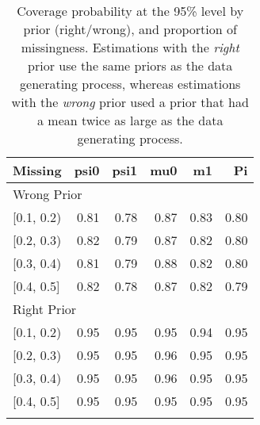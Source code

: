 \begin{table}[ht]
\centering
\begin{tabular}{lrrrrr}
  \toprule
Missing & psi0 & psi1 & mu0 & m1 & Pi \\ 
  \midrule
\multicolumn{6}{l}{Wrong Prior}\\
{[0.1, 0.2)} & 0.81 & 0.78 & 0.87 & 0.83 & 0.80 \\ 
  {[0.2, 0.3)} & 0.82 & 0.79 & 0.87 & 0.82 & 0.80 \\ 
  {[0.3, 0.4)} & 0.81 & 0.79 & 0.88 & 0.82 & 0.80 \\ 
  {[0.4, 0.5]} & 0.82 & 0.78 & 0.87 & 0.82 & 0.79 \\ 
   \midrule
\multicolumn{6}{l}{Right Prior}\\
{[0.1, 0.2)} & 0.95 & 0.95 & 0.95 & 0.94 & 0.95 \\ 
  {[0.2, 0.3)} & 0.95 & 0.95 & 0.96 & 0.95 & 0.95 \\ 
  {[0.3, 0.4)} & 0.95 & 0.95 & 0.96 & 0.95 & 0.95 \\ 
  {[0.4, 0.5]} & 0.95 & 0.95 & 0.95 & 0.95 & 0.95 \\ 
   \bottomrule
\multicolumn{6}{l}{}\\
\end{tabular}
\caption{Coverage probability at the 95\% level by prior (right/wrong), and proportion of missingness. Estimations with the \emph{right} prior use the same priors as the data generating process, whereas estimations with the \emph{wrong} prior used a prior that had a mean twice as large as the data generating process.} 
\label{tab:coverage95-method-missigness}
\end{table}
